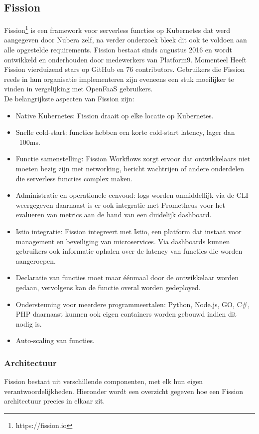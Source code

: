 \subsection{Fission}
Fission\footnote{https://fission.io} is een framework voor serverless functies op Kubernetes dat werd aangegeven door Nubera zelf, na verder onderzoek bleek dit ook te voldoen aan alle opgestelde requirements. Fission bestaat sinds augustus 2016 en wordt ontwikkeld en onderhouden door medewerkers van Platform9. Momenteel Heeft Fission vierduizend stars op GitHub en 76 contributors. Gebruikers die Fission reeds in hun organisatie implementeren zijn eveneens een stuk moeilijker te vinden in vergelijking met OpenFaaS gebruikers.
\\
De  belangrijkste aspecten van Fission zijn:
\begin{itemize}
    \item Native Kubernetes: Fission draait op elke locatie op Kubernetes.
    \item Snelle cold-start: functies hebben een korte cold-start latency, lager dan ~100ms.
    \item Functie samenstelling: Fission Workflows zorgt ervoor dat ontwikkelaars niet moeten bezig zijn met networking, bericht wachtrijen of andere onderdelen die serverless functies complex maken.
    \item Administratie en operationele eenvoud: logs worden onmiddellijk via de CLI weergegeven daarnaast is er ook integratie met Prometheus voor het evalueren van metrics aan de hand van een duidelijk dashboard.
    \item Istio integratie: Fission integreert met Istio, een platform dat instaat voor management en beveiliging van microservices. Via dashboards kunnen gebruikers ook informatie ophalen over de latency van functies die worden aangeroepen.
    \item Declaratie van functies moet maar éénmaal door de ontwikkelaar worden gedaan, vervolgens kan de functie overal worden gedeployed.
    \item Ondersteuning voor meerdere programmeertalen: Python, Node.js, GO, C\#, PHP daarnaast kunnen ook eigen containers worden gebouwd indien dit nodig is. 
    \item Auto-scaling van functies. 
\end{itemize}

\subsubsection{Architectuur}
Fission bestaat uit verschillende componenten, met elk hun eigen verantwoordelijkheden. Hieronder wordt een overzicht gegeven hoe een Fission architectuur precies in elkaar zit. 

